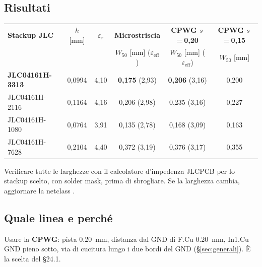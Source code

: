 \documentclass[a4paper,10pt]{article}
\newcommand{\net}[1]{\texttt{\detokenize{#1}}}
\newcounter{regola}
\begin{document}
\subsection{Risultati}
{\small
\begin{center}
\begin{tabular}{@{}lccccc@{}}
\toprule
\textbf{Stackup JLC} & $h$ [mm] & $\varepsilon_r$ & \textbf{Microstriscia} & \textbf{CPWG $s$\,=\,0,20} & \textbf{CPWG $s$\,=\,0,15}\\
& & & $W_{50}$ [mm] ($\varepsilon_\mathrm{eff}$) & $W_{50}$ [mm] ($\varepsilon_\mathrm{eff}$) & $W_{50}$ [mm]\\
\midrule
\textbf{JLC04161H-3313} & 0,0994 & 4,10 & \textbf{0,175} (2,93) & \textbf{0,206} (3,16) & 0,200\\
JLC04161H-2116 & 0,1164 & 4,16 & 0,206 (2,98) & 0,235 (3,16) & 0,227\\
JLC04161H-1080 & 0,0764 & 3,91 & 0,135 (2,78) & 0,168 (3,09) & 0,163\\
JLC04161H-7628 & 0,2104 & 4,40 & 0,372 (3,19) & 0,376 (3,17) & 0,355\\
\bottomrule
\end{tabular}
\end{center}}

\begin{verifica}[impedenze]
Verificare tutte le larghezze con il calcolatore d'impedenza JLCPCB per lo stackup scelto, con solder
mask, prima di sbrogliare. Se la larghezza cambia, aggiornare la netclass \net{RF_50R}.
\end{verifica}

\subsection{Quale linea e perché}

\begin{regola}
Usare la \textbf{CPWG}: pista \SI{0.20}{mm}, distanza dal GND di F.Cu \SI{0.20}{mm}, In1.Cu GND pieno
sotto, via di cucitura lungo i due bordi del GND (\S\ref{sec:generali}). È la scelta del \S24.1.
\end{regola}
\end{document}
